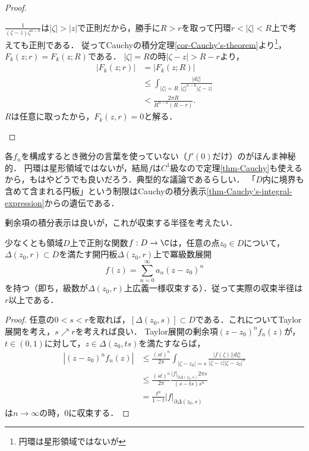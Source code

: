 \documentclass[uplatex, dvipdfmx]{jsreport}
\begin{document}
\begin{proof}
\begin{enumerate}
    $\frac{1}{(\zeta-z)\zeta^{n-k}}$は$|\zeta|>|z|$で正則だから，勝手に$R>r$を取って円環$r<|\zeta|<R$上で考えても正則である．
    従ってCauchyの積分定理\ref{cor-Cauchy's-theorem}より\footnote{円環は星形領域ではないが}，$F_k(z;r)=F_k(z;R)$である．
    $|\zeta|=R$の時$|\zeta-z|>R-r$より，
    \begin{align*}
        |F_k(z;r)|&=|F_k(z;R)|\\
        &\le\int_{|\zeta|=R}\frac{|d\zeta|}{|\zeta|^{n-k}|\zeta-z|}\\
        &<\frac{2\pi R}{R^{n-k}(R-r)}.
    \end{align*}
    $R$は任意に取ったから，$F_k(z,r)=0$と解る．
    \end{enumerate}
\end{proof}
\begin{remarks}
    各$f_n$を構成するとき微分の言葉を使っていない（$f'(0)$だけ）のがほんま神秘的．
    円環は星形領域ではないが，結局$f$は$C^1$級なので定理\ref{thm-Cauchy}も使えるから，もはやどうでも良いだろう．典型的な議論であるらしい．
    「$D$内に境界も含めて含まれる円板」という制限はCauchyの積分表示\ref{thm-Cauchy's-integral-expression}からの遺伝である．
\end{remarks}

剰余項の積分表示は良いが，これが収束する半径を考えたい．

\begin{corollary}\label{cor-serial-expression-of-regular-functions}
    少なくとも領域$D$上で正則な関数$f:D\to\C$は，任意の点$z_0\in D$について，$\Delta(z_0,r)\subset D$を満たす開円板$\Delta(z_0,r)$上で冪級数展開
    \[ f(z)=\sum^\infty_{n=0}a_n(z-z_0)^n \]
    を持つ（即ち，級数が$\Delta(z_0,r)$上広義一様収束する）．従って実際の収束半径は$r$以上である．
\end{corollary}
\begin{proof}
    任意の$0<s<r$を取れば，$[\Delta(z_0,s)]\subset D$である．これについてTaylor展開を考え，$s\nearrow r$を考えれば良い．
    Taylor展開の剰余項$(z-z_0)^nf_n(z)$が，$t\in(0,1)$に対して，$z\in\Delta(z_0,ts)$を満たすならば，
    \begin{align*}
        |(z-z_0)^nf_n(z)|&\le\frac{(st)^n}{2\pi}\int_{|\zeta-z_0|=s}\frac{|f(\zeta)||d\zeta|}{|\zeta-z||\zeta-z_0|^n}\\
        &\le \frac{(st)^n}{2\pi}\frac{|f|_{\partial\Delta(z_0,s)}2\pi s}{(s-ts)s^n}\\
        &=\frac{t^n}{1-t}|f|_{\partial\Delta(z_0,s)}
    \end{align*}
    は$n\to\infty$の時，$0$に収束する．
\end{proof}
\end{document}
